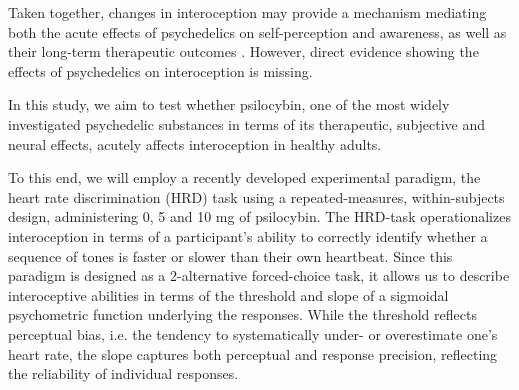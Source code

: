 \documentclass{article}
\begin{document}
Taken together, changes in interoception may provide a mechanism mediating both the acute effects of psychedelics on self-perception and awareness, as well as their long-term therapeutic outcomes \parencite{ho2020bodily-self-psy}. %
However, direct evidence showing the effects of psychedelics on interoception is missing.
\begin{comment}
    from legrand 2022, https://www.sciencedirect.com/science/article/pii/S0301051121002325: 
    - for review see Brener & Ring, 2016; Desmedt, Luminet, & Corneille, 2018; Desmedt, Corneille, et al., 2020; Ring & Brener, 2018; Zamariola, Maurage, Luminet, & Corneille, 2018.
    # HBC
    - Crucially, even when the heart rate is directly modulated by as much as 60 beats per minute (BPM) via pacemaker, counted heartbeats showed little alteration beyond expectations about different sitting or standing postures on the heart rate (Windmann, Schonecke, Fröhlig, & Maldener, 1999).
    - A more accurate prior knowledge about one's heart rate, e.g. amongst medical practitioners or athletes, can influence HBC accuracy scores (Murphy et al., 2018), such that when explicitly instructing participants not to estimate beats, but to instead count felt ones, this bias is reduced (Desmedt et al., 2018).
    - More recently, the validity of the HBC task has been further questioned by reports showing that interoceptive accuracy scores are largely driven by under-counting (Zamariola et al., 2018), suggesting that HBC-derived scores are merely a rough reflection of subjective beliefs about the heart rate (Desmedt, Luminet, Maurage, & Corneille, 2020).
    - This poor construct validity could also explain why little to no relationship between HBC-derived scores and various psychiatric symptom measures has been found at the meta-analytic level (Desmedt, Houte, et al., 2020)

    # HBD
\end{comment}
In this study, we aim to test whether psilocybin, one of the most widely investigated psychedelic substances in terms of its therapeutic, subjective and neural effects, acutely affects interoception in healthy adults. 

To this end, we will employ a recently developed experimental paradigm, the heart rate discrimination (HRD) task \parencite{legrand2022heart} using a repeated-measures, within-subjects design, administering 0, 5 and 10 mg of psilocybin. The HRD-task operationalizes interoception in terms of a participant’s ability to correctly identify whether a sequence of tones is faster or slower than their own heartbeat. Since this paradigm is designed as a 2-alternative forced-choice task, it allows us to describe interoceptive abilities in terms of the threshold and slope of a sigmoidal psychometric function underlying the responses. While the threshold reflects perceptual bias, i.e. the tendency to systematically under- or overestimate one’s heart rate, the slope captures both perceptual and response precision, reflecting the reliability of individual responses.
\end{document}
